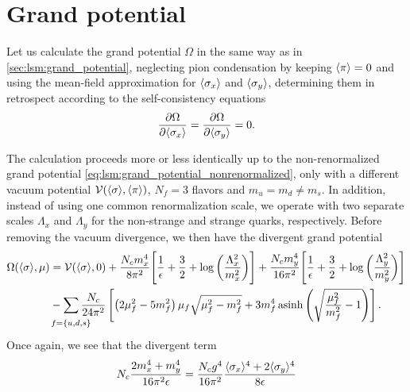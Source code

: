\section{Grand potential}

Let us calculate the grand potential $\Omega$ in the same way as in \cref{sec:lsm:grand_potential},
neglecting pion condensation by keeping $\langle \pi \rangle=0$
and using the mean-field approximation for $\langle \sigma_x \rangle$ and $\langle \sigma_y \rangle$,
determining them in retrospect according to the self-consistency equations
\begin{equation}
	\pdv{\Omega}{ \langle \sigma_x \rangle} =
	\pdv{\Omega}{ \langle \sigma_y \rangle} = 0.
\end{equation}

The calculation proceeds more or less identically up to the non-renormalized grand potential \eqref{eq:lsm:grand_potential_nonrenormalized},
only with a different vacuum potential $\mathcal{V}(\langle \sigma \rangle,\langle \pi \rangle)$, $N_f=3$ flavors and $m_u = m_d \neq m_s$.
In addition, instead of using one common renormalization scale, we operate with two separate scales $\Lambda_x$ and $\Lambda_y$ for the non-strange and strange quarks, respectively.
Before removing the vacuum divergence, we then have the divergent grand potential
\begin{equation}
\begin{split}
	\Omega(\avg{\sigma},\mu) &= \pot(\avg{\sigma},0) + \frac{N_c m_x^4}{8 \pi^2} \Bigg[ \frac{1}{\epsilon} + \frac{3}{2} + \log\bigg(\frac{\Lambda_x^2}{m_x^2}\bigg) \Bigg] + \frac{N_c m_y^4}{16 \pi^2} \Bigg[ \frac{1}{\epsilon} + \frac{3}{2} + \log\bigg(\frac{\Lambda_y^2}{m_y^2}\bigg) \Bigg] \\ %
	                         &-\smashoperator{\sum_{\vphantom{\big|} f=\{u,d,s\}}} \frac{N_c}{24 \pi^2} \left[ \left( 2 \mu_f^2 - 5 m_f^2 \right) \mu_f \sqrt{\mu_f^2 - m_f^2} + 3 m_f^4 \asinh \left( \sqrt{\frac{\mu_{\smash{f}}^2}{m_f^2}-1} \right) \right]. \\
\end{split}
\end{equation}
Once again, we see that the divergent term
\begin{equation}
	N_c \frac{2 m_x^4 + m_y^4}{16 \pi^2 \epsilon} =
	\frac{N_c g^4}{16 \pi^2} \frac{\langle \sigma_x \rangle^4 + 2 \langle \sigma_y \rangle^4}{8 \epsilon}
\end{equation}
